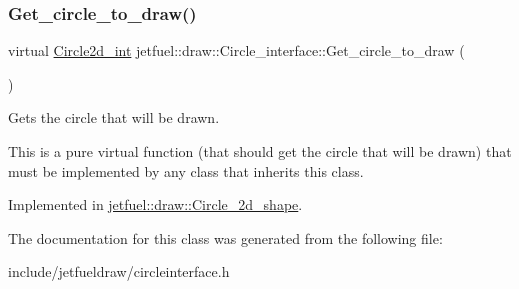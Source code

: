\subsubsection{\texorpdfstring{Get\+\_\+circle\+\_\+to\+\_\+draw()}{Get\_circle\_to\_draw()}}
{\footnotesize\ttfamily virtual \hyperlink{classjetfuel_1_1draw_1_1Circle2d}{Circle2d\+\_\+int} jetfuel\+::draw\+::\+Circle\+\_\+interface\+::\+Get\+\_\+circle\+\_\+to\+\_\+draw (\begin{DoxyParamCaption}{ }\end{DoxyParamCaption})\hspace{0.3cm}{\ttfamily [pure virtual]}}



Gets the circle that will be drawn. 

This is a pure virtual function (that should get the circle that will be drawn) that must be implemented by any class that inherits this class. 

Implemented in \hyperlink{classjetfuel_1_1draw_1_1Circle__2d__shape_ab188ed6716dff22d0498a01ac1e93d90}{jetfuel\+::draw\+::\+Circle\+\_\+2d\+\_\+shape}.



The documentation for this class was generated from the following file\+:\begin{DoxyCompactItemize}
\item 
include/jetfueldraw/circleinterface.\+h\end{DoxyCompactItemize}
